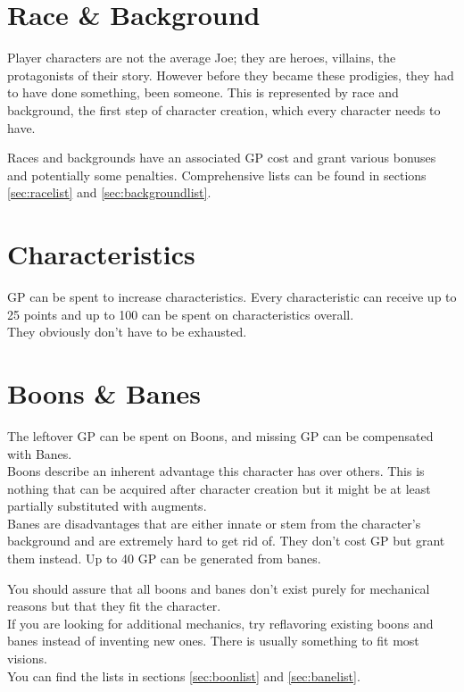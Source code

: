 \documentclass[12pt,a4paper,openany,usenames,dvipsnames]{book}
\begin{document}
	\section{Race \& Background}
	Player characters are not the average Joe; they are heroes, villains, the protagonists of their story. However before they became these prodigies, they had to have done something, been someone. This is represented by race and background, the first step of character creation, which every character needs to have.\par
	Races and backgrounds have an associated GP cost and grant various bonuses and potentially some penalties. Comprehensive lists can be found in sections \ref{sec:racelist} and \ref{sec:backgroundlist}.
	\section{Characteristics}
	GP can be spent to increase characteristics. Every characteristic can receive up to 25 points and up to 100 can be spent on characteristics overall.\\
	They obviously don’t have to be exhausted.
	\section{Boons \& Banes}
	The leftover GP can be spent on Boons, and missing GP can be compensated with Banes.\\
	Boons describe an inherent advantage this character has over others. This is nothing that can be acquired after character creation but it might be at least partially substituted with augments.\\
	Banes are disadvantages that are either innate or stem from the character’s background and are extremely hard to get rid of. They don’t cost GP but grant them instead. Up to 40 GP can be generated from banes.
	\par
	You should assure that all boons and banes don’t exist purely for mechanical reasons but that they fit the character.\\
	If you are looking for additional mechanics, try reflavoring existing boons and banes instead of inventing new ones. There is usually something to fit most visions.\\
	You can find the lists in sections \ref{sec:boonlist} and \ref{sec:banelist}.
\end{document}

